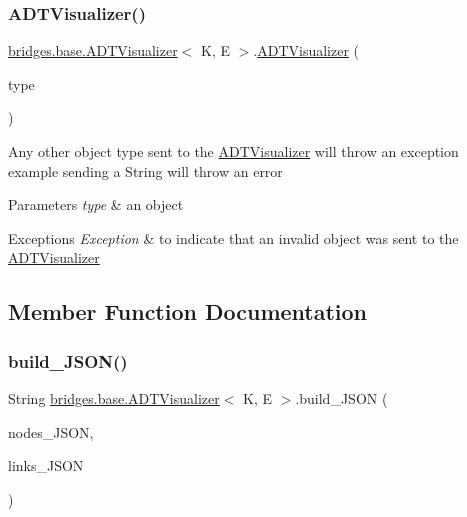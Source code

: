 \subsubsection{\texorpdfstring{A\+D\+T\+Visualizer()}{ADTVisualizer()}\hspace{0.1cm}{\footnotesize\ttfamily [2/2]}}
{\footnotesize\ttfamily \hyperlink{classbridges_1_1base_1_1_a_d_t_visualizer}{bridges.\+base.\+A\+D\+T\+Visualizer}$<$ K, E $>$.\hyperlink{classbridges_1_1base_1_1_a_d_t_visualizer}{A\+D\+T\+Visualizer} (\begin{DoxyParamCaption}\item[{Object}]{type }\end{DoxyParamCaption})}

Any other object type sent to the \hyperlink{classbridges_1_1base_1_1_a_d_t_visualizer}{A\+D\+T\+Visualizer} will throw an exception example sending a String will throw an error 
\begin{DoxyParams}{Parameters}
{\em type} & an object \\
\hline
\end{DoxyParams}

\begin{DoxyExceptions}{Exceptions}
{\em Exception} & to indicate that an invalid object was sent to the \hyperlink{classbridges_1_1base_1_1_a_d_t_visualizer}{A\+D\+T\+Visualizer} \\
\hline
\end{DoxyExceptions}


\subsection{Member Function Documentation}
\hypertarget{classbridges_1_1base_1_1_a_d_t_visualizer_a86ec26c0bb98a48a63366ce380ca958f}{}\label{classbridges_1_1base_1_1_a_d_t_visualizer_a86ec26c0bb98a48a63366ce380ca958f} 
\subsubsection{\texorpdfstring{build\+\_\+\+J\+S\+O\+N()}{build\_JSON()}\hspace{0.1cm}{\footnotesize\ttfamily [1/2]}}
{\footnotesize\ttfamily String \hyperlink{classbridges_1_1base_1_1_a_d_t_visualizer}{bridges.\+base.\+A\+D\+T\+Visualizer}$<$ K, E $>$.build\+\_\+\+J\+S\+ON (\begin{DoxyParamCaption}\item[{String\+Builder}]{nodes\+\_\+\+J\+S\+ON,  }\item[{String\+Builder}]{links\+\_\+\+J\+S\+ON }\end{DoxyParamCaption})}

